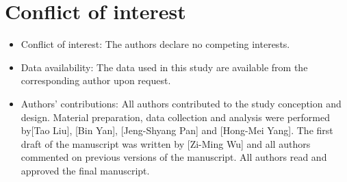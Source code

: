 %
\section*{Conflict of interest}
\begin{itemize}
	\item Conflict of interest: The authors declare no competing interests.
	\item Data availability: The data used in this study are available from the corresponding author upon request.
	\item Authors' contributions: All authors contributed to the study conception and design. Material preparation, data collection and analysis were performed by[Tao Liu], [Bin Yan], [Jeng-Shyang Pan] and [Hong-Mei Yang]. The first draft of the manuscript was written by [Zi-Ming Wu] and all authors commented on previous versions of the manuscript. All authors read and approved the final manuscript.
	
\end{itemize}
%







